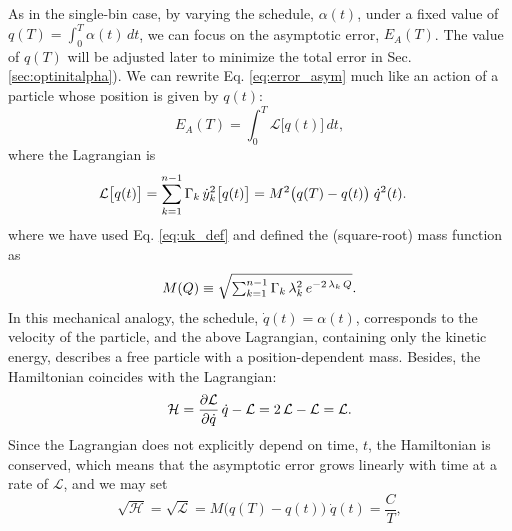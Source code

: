 \documentclass[reprint, superscriptaddress, floatfix]{revtex4-1}
\newcommand{\Err}{E}
\begin{document}
As in the single-bin case,
by varying the schedule, $\alpha(t)$, under a fixed value of
$q(T) = \int_0^T \alpha(t) \, dt$,
we can focus on the asymptotic error,
$\Err_A(T)$.
%
The value of $q(T)$ will be adjusted later
to minimize the total error in Sec. \ref{sec:optinitalpha}).
%
We can rewrite Eq. \eqref{eq:error_asym} much like an action
of a particle whose position is given by $q(t)$:
%
\begin{equation}
  \Err_A(T)
  =
  \int_0^T
    {\mathcal L} \bigl[ q(t)\bigr]
    \, dt
  ,
\label{eq:error_asym_Lagrangian}
\end{equation}
%
where the Lagrangian is
%
\begin{align}
  {\mathcal L} \bigl[ q(t) \bigr]
  &=
  \sum_{ k = 1 }^{n - 1}
    \Gamma_k \, {\dot y}_k^2\bigl[ q(t) \bigr]
  =
  M^2\bigl(q(T) - q(t) \bigr)
  \; \dot q^2( t )
  .
\notag
\end{align}
%
where we have
used Eq. \eqref{eq:uk_def} and
defined the (square-root) mass function as
%
\begin{equation}
  M(Q)
  \equiv
  \sqrt{
    \textstyle\sum_{ k = 1 }^{n - 1}\Gamma_k \, \lambda_k^2 \, e^{-2 \, \lambda_k \, Q}
  }
  .
  \notag
\end{equation}
%
In this mechanical analogy,
the schedule, $\dot q(t) = \alpha(t)$,
corresponds to the velocity of the particle,
%
and the above Lagrangian, containing only the kinetic energy,
describes a free particle
with a position-dependent mass.
%
Besides, the Hamiltonian
coincides with the Lagrangian:
%
\begin{equation}
  \mathcal H
  =
  \frac{ \partial \mathcal L }
       { \partial \dot q     }
  \, \dot q
  -
  \mathcal L
  =
  2 \, \mathcal L
  - \mathcal L
  =
  \mathcal L
  .
  \notag
\end{equation}
%
Since the Lagrangian
does not explicitly depend on time, $t$,
the Hamiltonian is conserved,
which means that the asymptotic error grows
linearly with time at a rate of $\mathcal L$,
and we may set
%
\begin{equation}
  \sqrt{ \mathcal H }
  =
  \sqrt{ \mathcal L }
  =
  M\bigl( q(T) - q(t) \bigr)
  \;
  \dot q(t)
  =
  \frac{C}{T}
  ,
  \label{eq:Lagrangian_const}
\end{equation}
\end{document}
